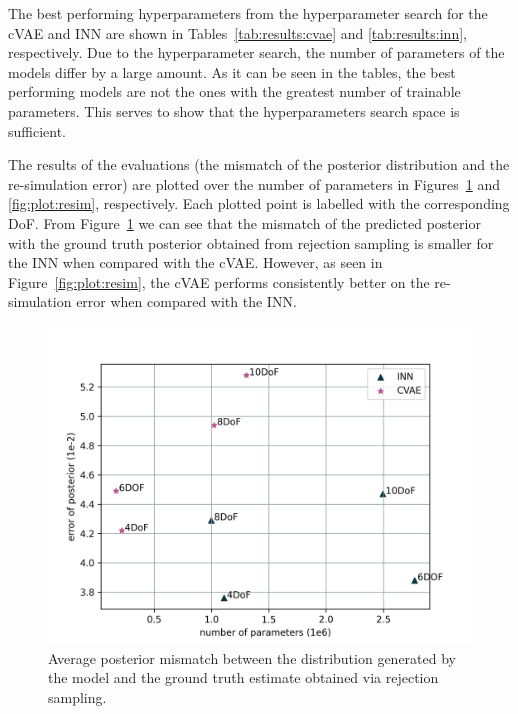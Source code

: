 \documentclass[conference]{IEEEtran}
\begin{document}
The best performing hyperparameters from the hyperparameter search for the cVAE and INN are shown in Tables~\ref{tab:results:cvae} and \ref{tab:results:inn}, respectively. Due to the hyperparameter search, the number of parameters of the models differ by a large amount. As it can be seen in the tables, the best performing models are not the ones with the greatest number of trainable parameters. This serves to show that the hyperparameters search space is sufficient. 

The results of the evaluations (the mismatch of the posterior distribution and the re-simulation error) are plotted over the number of parameters in Figures~\ref{fig:plot:posterior} and \ref{fig:plot:resim}, respectively. Each plotted point is labelled with the corresponding DoF. From Figure~\ref{fig:plot:posterior} we can see that the mismatch of the predicted posterior with the ground truth posterior obtained from rejection sampling is smaller for the INN when compared with the cVAE. However, as seen in Figure~\ref{fig:plot:resim}, the cVAE performs consistently better on the re-simulation error when compared with the INN.

\begin{figure}[ht]
\centering
	\includegraphics[width=\linewidth]{figures/comparison_e_posterior_alternative.png}
    \caption{\label{fig:plot:posterior} Average posterior mismatch between the distribution generated by the model and the ground truth estimate obtained via rejection sampling.}
\end{figure}
\end{document}
